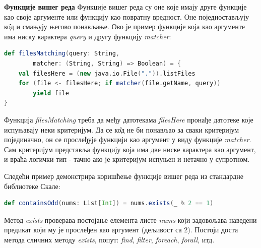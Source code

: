 \documentclass[12pt,oneside]{memoir}
\begin{document}
\begin{description}
\item \textbf{Функције вишег реда} %
Функције вишег реда су оне које имају друге функције као своје аргументе или функцију као повратну вредност. Оне поједностављују к\^{о}д и смањују његово понављање. Ово је пример функције која као аргументе има ниску карактера \textit{query} и другу функцију \textit{matcher}:
\begin{lstlisting}[language=Scala]
def filesMatching(query: String, 
		matcher: (String, String) => Boolean) = {
	val filesHere = (new java.io.File(".")).listFiles
	for (file <- filesHere; if matcher(file.getName, query))
		yield file
}
\end{lstlisting}
Функција \textit{filesMatching} треба да међу датотекама \textit{filesHere} пронађе датотеке које испуњавају неки критеријум. Да се к\^{о}д не би понављао за сваки критеријум појединачно, он се прослеђује функцији као аргумент у виду функције \textit{matcher}. Сам критеријум представља функцију која има две ниске карактера као аргумент, и враћа логички тип - тачно ако је критеријум испуњен и нетачно у супротном.
\par Следећи пример демонстрира коришћење функције вишег реда из стандардне библиотеке Скале:
\begin{lstlisting}[language=Scala]
def containsOdd(nums: List[Int]) = nums.exists(_ % 2 == 1)
\end{lstlisting}
Метод \textit{exists} проверава постојање елемента листе \textit{nums} који задовољава наведени предикат који му је прослеђен као аргумент (дељивост са 2).  Постоји доста метода сличних методу \textit{exists}, попут: \textit{find}, \textit{filter}, \textit{foreach}, \textit{forall}, итд.


\end{description}
\end{document}
